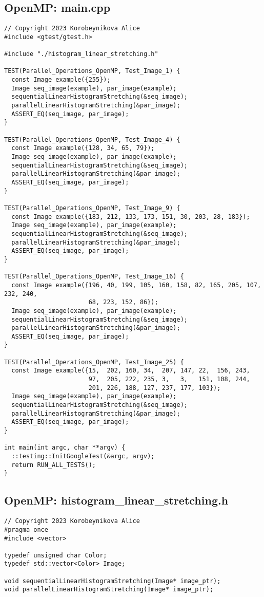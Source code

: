 \documentclass[14pt, russian]{extarticle}
\begin{document}
	\subsection{OpenMP: main.cpp}
	\begin{lstlisting}
// Copyright 2023 Korobeynikova Alice
#include <gtest/gtest.h>

#include "./histogram_linear_stretching.h"

TEST(Parallel_Operations_OpenMP, Test_Image_1) {
  const Image example({255});
  Image seq_image(example), par_image(example);
  sequentialLinearHistogramStretching(&seq_image);
  parallelLinearHistogramStretching(&par_image);
  ASSERT_EQ(seq_image, par_image);
}

TEST(Parallel_Operations_OpenMP, Test_Image_4) {
  const Image example({128, 34, 65, 79});
  Image seq_image(example), par_image(example);
  sequentialLinearHistogramStretching(&seq_image);
  parallelLinearHistogramStretching(&par_image);
  ASSERT_EQ(seq_image, par_image);
}

TEST(Parallel_Operations_OpenMP, Test_Image_9) {
  const Image example({183, 212, 133, 173, 151, 30, 203, 28, 183});
  Image seq_image(example), par_image(example);
  sequentialLinearHistogramStretching(&seq_image);
  parallelLinearHistogramStretching(&par_image);
  ASSERT_EQ(seq_image, par_image);
}

TEST(Parallel_Operations_OpenMP, Test_Image_16) {
  const Image example({196, 40, 199, 105, 160, 158, 82, 165, 205, 107, 232, 240,
                       68, 223, 152, 86});
  Image seq_image(example), par_image(example);
  sequentialLinearHistogramStretching(&seq_image);
  parallelLinearHistogramStretching(&par_image);
  ASSERT_EQ(seq_image, par_image);
}

TEST(Parallel_Operations_OpenMP, Test_Image_25) {
  const Image example({15,  202, 160, 34,  207, 147, 22,  156, 243,
                       97,  205, 222, 235, 3,   3,   151, 108, 244,
                       201, 226, 188, 127, 237, 177, 103});
  Image seq_image(example), par_image(example);
  sequentialLinearHistogramStretching(&seq_image);
  parallelLinearHistogramStretching(&par_image);
  ASSERT_EQ(seq_image, par_image);
}

int main(int argc, char **argv) {
  ::testing::InitGoogleTest(&argc, argv);
  return RUN_ALL_TESTS();
}

	\end{lstlisting}
	\newpage
	\subsection{OpenMP: histogram\_linear\_stretching.h
}
	\begin{lstlisting}
// Copyright 2023 Korobeynikova Alice
#pragma once
#include <vector>

typedef unsigned char Color;
typedef std::vector<Color> Image;

void sequentialLinearHistogramStretching(Image* image_ptr);
void parallelLinearHistogramStretching(Image* image_ptr);

	\end{lstlisting}
	\newpage
\end{document}

